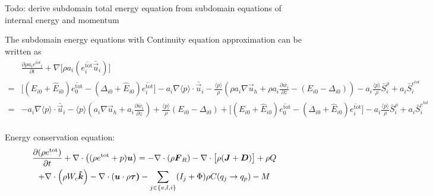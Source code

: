 \documentclass{report}
\begin{document}
Todo: derive subdomain total energy equation from subdomain equations of internal energy and momentum 



The subdomain energy equations with Continuity equation approximation can be written as 
\begin{align*}
&\frac{\partial \rho a_i \overline{e^{tot}}_i}{\partial t} 
 + \nabla\Big[\rho a_i(\overline{e_i^\mathrm{tot}} \bar{\vec{u}}_i)\Big] \\
 =& \Big[(E_{i0} + \hat{E}_{i0}) \overline{e_0^\mathrm{tot}}  - (\Delta_{i0} + \hat{E}_{i0}) \overline{e_i^\mathrm{tot}} \Big]   -  a_i  \nabla\langle p \rangle  \cdot \bar{\vec{u}}_i  -  \frac{\langle p \rangle }{\rho} \left(\rho a_i \nabla \vec{u}_h  + \rho a_i \frac{\partial \bar{w}_i}{\partial z} - (E_{i0} - \Delta_{i0})\right)   -  a_i  \frac{\langle p \rangle}{\rho} \bar{S}_i^{\rho} + a_i \bar{S}^{e^{tot}}_i\\
 =&   -  a_i  \nabla\langle p \rangle  \cdot \bar{\vec{u}}_i  - \langle p \rangle  \left(a_i \nabla \vec{u}_h  + a_i \frac{\partial \bar{w}_i}{\partial z}  \right)  
 + \frac{\langle p \rangle }{\rho}  (E_{i0} - \Delta_{i0})
 +\Big[(E_{i0} + \hat{E}_{i0}) \overline{e_0^\mathrm{tot}}  - (\Delta_{i0} + \hat{E}_{i0}) \overline{e_i^\mathrm{tot}} \Big] 
 -  a_i  \frac{\langle p \rangle}{\rho} \bar{S}_i^{\rho} + a_i \bar{S}^{e^{tot}}_i\\
\end{align*}







































\newpage
Energy conservation equation:
\begin{multline}
 \diff{(\rho e^\mathrm{tot})}{t} + \divergence \left( (\rho e^\mathrm{tot} + p)\vec{u} \right)
 = -\divergence (\rho \vec{F}_R) - \divergence \bigl[\rho (\vec{J} + \vec{D})\bigr] + \rho Q  \\
  +\divergence \left(\rho W_c \vec{\hat k} \right)  - \divergence (\vec{u} \cdot \rho\vec{\tau)} %
   - \sum_{j\in\{v,l,i\}}(I_j + \Phi)  \rho C(q_j \rightarrow q_p) - M
\end{multline}
\end{document}

